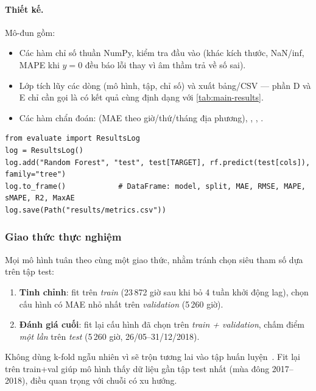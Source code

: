 \paragraph{Thiết kế.} Mô-đun gồm:
\begin{itemize}
  \item Các hàm chỉ số thuần NumPy, kiểm tra đầu vào (khác kích thước, NaN/inf, MAPE khi $y=0$ đều báo lỗi
        thay vì âm thầm trả về số sai).
  \item Lớp  tích lũy các dòng (mô hình, tập, chỉ số) và xuất bảng/CSV --- phần D và E chỉ
        cần gọi  là có kết quả cùng định dạng với \cref{tab:main-results}.
  \item Các hàm chẩn đoán:  (MAE theo giờ/thứ/tháng địa phương), ,
        , .
\end{itemize}

\begin{lstlisting}[caption={Cách dùng \code{evaluate.py} cho bất kỳ mô hình nào.},label={lst:evaluate}]
from evaluate import ResultsLog
log = ResultsLog()
log.add("Random Forest", "test", test[TARGET], rf.predict(test[cols]), family="tree")
log.to_frame()            # DataFrame: model, split, MAE, RMSE, MAPE, sMAPE, R2, MaxAE
log.save(Path("results/metrics.csv"))
\end{lstlisting}

\subsubsection{Giao thức thực nghiệm}\label{sec:protocol}

Mọi mô hình tuân theo cùng một giao thức, nhằm tránh chọn siêu tham số dựa trên tập test:
\begin{enumerate}
  \item \textbf{Tinh chỉnh}: fit trên \emph{train} (23\,872 giờ sau khi bỏ 4 tuần khởi động lag), chọn cấu hình
        có MAE nhỏ nhất trên \emph{validation} (5\,260 giờ).
  \item \textbf{Đánh giá cuối}: fit lại cấu hình đã chọn trên \emph{train + validation}, chấm điểm \emph{một lần}
        trên \emph{test} (5\,260 giờ, 26/05--31/12/2018).
\end{enumerate}
Không dùng k-fold ngẫu nhiên vì sẽ trộn tương lai vào tập huấn luyện~\cite{bergmeir2012cv}. Fit lại trên
train+val giúp mô hình thấy dữ liệu gần tập test nhất (mùa đông 2017--2018), điều quan trọng với chuỗi có xu hướng.

